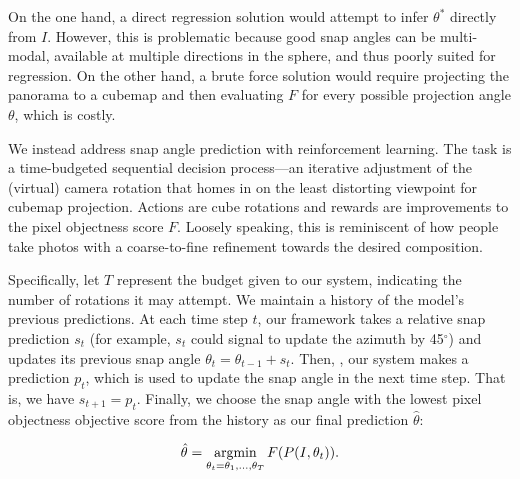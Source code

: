 On the one hand, a direct regression solution would attempt to infer $\theta^\ast$ directly from $I$.  However, this is problematic because good snap angles can be multi-modal,  available at multiple directions in the sphere, and thus poorly suited for regression.  
On the other hand, a brute force solution would require projecting the panorama to a cubemap and then evaluating $F$ for every possible projection angle $\theta$, which is costly.

We instead address snap angle prediction with reinforcement learning.  The task is a time-budgeted sequential decision process---an iterative adjustment of the (virtual) camera rotation that homes in on the least distorting viewpoint for cubemap projection.  Actions are cube rotations and rewards are improvements to the pixel objectness score $F$.  Loosely speaking, this is reminiscent of how people take photos with a coarse-to-fine refinement towards the desired composition.  



Specifically, let $T$ represent the budget given to our system, indicating the number of rotations it may attempt.  We maintain a history of the model's previous predictions. At each time step $t$, our framework takes a relative snap prediction $s_t$ (for example, $s_{t}$ could  signal to update the azimuth by 45$^{\circ}$) and updates its previous snap angle $\theta_{t}=\theta_{t-1}+s_t$. Then, , our system makes a prediction $p_t$, which is used to update the snap angle in the next time step. That is, we have $s_{t+1}=p_t$. Finally, we choose the snap angle 
with the lowest pixel objectness objective score from the history as our final prediction $\hat{\theta}$:

\begin{equation}
\hat{\theta}=\operatorname*{argmin}_{\theta_t=\theta_1,...,\textcolor{black}{\theta_T}} F(\textcolor{black}{P}(I,\theta_t)).
\end{equation}






